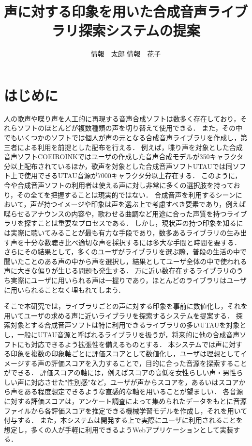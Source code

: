 \documentclass[a4j,8pt,twocolumn]{extarticle}
\title{声に対する印象を用いた合成音声ライブラリ探索システムの提案}
\author{情報　太郎 \qquad 情報　花子}
\affiliation{情報大学情報学部}
\begin{document}
\maketitle
\thispagestyle{empty}	%

\section{はじめに}

人の歌声や喋り声を人工的に再現する音声合成ソフトは数多く存在しており，それらソフトのほとんどが複数種類の声を切り替えて使用できる．
また，その中でもいくつかのソフトでは個人が声の元となる合成音声ライブラリを作成し，第三者による利用を前提とした配布を行える．
例えば，喋り声を対象とした合成音声ソフトCOEIROINKではユーザの作成した音声合成モデルが350キャラクタ分以上配布されているほか\cite{mycoeiroink}，歌声を対象とした合成音声ソフトUTAUでは同ソフト上で使用できるUTAU音源が7000キャラクタ分以上存在する\cite{vdbutau}．
このように，今や合成音声ソフトの利用者は使える声に対し非常に多くの選択肢を持っており，その全てを把握することは現実的ではない．
合成音声を利用するシーンにおいて，声が持つイメージや印象は声を選ぶ上で考慮すべき要素であり，例えば喋らせるアナウンスの内容や，歌わせる曲調など用途に合った声質を持つライブラリを探すことは重要なプロセスである．
しかし，現状声の持つ印象を知るには実際に聴いてみることが最も有力な手段であり，数多あるライブラリの生み出す声を十分な数聴き比べ適切な声を採択するには多大な手間と時間を要する．
さらにその結果として，多くのユーザがライブラリを選ぶ際，普段の生活の中で聞いたことのある声の中から声を選択し，結果としてユーザ全体の中で使われる声に大きな偏りが生じる問題も発生する．
万に近い数存在するライブラリのうち実際にユーザに用いられる声は一握りであり，ほとんどのライブラリはユーザに用いられることなく埋もれてしまう．

そこで本研究では，ライブラリごとの声に対する印象を事前に数値化し，それを用いてユーザの求める声に近いライブラリを探索するシステムを提案する．
探索対象とする合成音声ソフトは特に利用できるライブラリの多いUTAUを対象とし，一般にUTAU音源と呼ばれるライブラリを扱うが，将来的に他の合成音声ソフトにも対応できるよう拡張性を備えるものとする．
本システムでは声に対する印象を複数の印象軸ごとに評価スコアとして数値化し，ユーザは理想としてイメージする声の評価スコアを入力することで，目的に合った音源を探索することができる．
評価スコアの軸には，例えばスコアの高低を女性らしい声・男性らしい声に対応させた"性別感"など，ユーザが声からスコアを，あるいはスコアから声をある程度想定できるような直感的な軸を用いることが望ましい．
各音源に対する評価スコアは，アンケート調査によって集められたデータをもとに音源ファイルから各評価スコアを推定できる機械学習モデルを作成し，それを用いて付与する．
また，本システムは開発する上で実際にユーザに利用されることを想定し，多くの人が手軽に利用できるようWebアプリケーションとして実装する．
\end{document}
